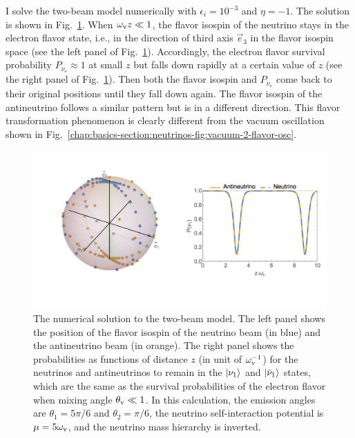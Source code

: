 I solve the two-beam model numerically with $\epsilon_i = 10^{-3}$ and $\eta=-1$. The solution is shown in Fig.~\ref{chap:collective-sec:two-beams-fig:two-beam-line-model-numerical-solution}. When $\omega_\mathrm v z \ll 1$, the flavor isospin of the neutrino stays in the electron flavor state, i.e., in the direction of third axis $\vec e_3$ in the flavor isospin space (see the left panel of Fig.~\ref{chap:collective-sec:two-beams-fig:two-beam-line-model-numerical-solution}). Accordingly, the electron flavor survival probability $P_{\nu_\ee}\approx 1$ at small $z$ but falls down rapidly at a certain value of $z$ (see the right panel of Fig.~\ref{chap:collective-sec:two-beams-fig:two-beam-line-model-numerical-solution}). Then both the flavor isospin and $P_{\nu_\ee}$ come back to their original positions until they fall down again. The flavor isospin of the antineutrino follows a similar pattern but is in a different direction. This flavor transformation phenomenon is clearly different from the vacuum oscillation shown in Fig.~\ref{chap:basics-section:neutrinos-fig:vacuum-2-flavor-osc}.

\begin{figure}[!htbp]
    \centering
    \includegraphics[width=\textwidth]{chapters/assets/collective/bipolar-animie100}
    \caption{The numerical solution to the two-beam model. The left panel shows the position of the flavor isospin of the neutrino beam (in blue) and the antineutrino beam (in orange). The right panel shows the probabilities as functions of distance $z$ (in unit of $\omega_\mathrm v^{-1}$) for the neutrinos and antineutrinos to remain in the $\left| \nu_1\right\rangle$ and $\left| \bar\nu_1\right\rangle$ states, which are the same as the survival probabilities of the electron flavor when mixing angle $\theta_\mathrm v \ll 1$. In this calculation, the emission angles are $\theta_1=5\pi/6$ and $\theta_2=\pi/6$, the neutrino self-interaction potential is $\mu=5 \omega_\mathrm v$, and the neutrino mass hierarchy is inverted. }
    \label{chap:collective-sec:two-beams-fig:two-beam-line-model-numerical-solution}
\end{figure}

